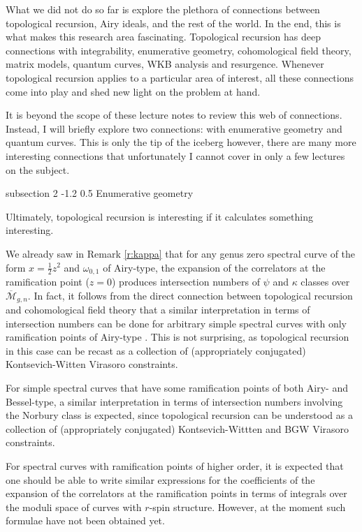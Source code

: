 \documentclass[reqno,oneside,11pt]{amsart}
\makeatletter
\theoremstyle{plain}
\theoremstyle{definition}
\theoremstyle{remark}
\numberwithin{equation}{section}
\renewcommand{\subsection}{\@startsection
{subsection}%
{2}%
{\z@}%
{-1.2\baselineskip}%
{0.5\baselineskip}%
{\normalfont \bf \normalsize}} %
\makeatother
\begin{document}
What we did not do so far is explore the plethora of connections between topological recursion, Airy ideals, and the rest of the world. In the end, this is what makes this research area fascinating. Topological recursion has deep connections with integrability, enumerative geometry, cohomological field theory, matrix models, quantum curves, WKB analysis and resurgence. Whenever topological recursion applies to a particular area of interest, all these connections come into play and shed new light on the problem at hand.

It is beyond the scope of these lecture notes to review this web of connections. Instead, I will briefly explore two connections: with enumerative geometry and quantum curves. This is only the tip of the iceberg however, there are many more interesting connections that unfortunately I cannot cover in only a few lectures on the subject.


\subsection{Enumerative geometry}

Ultimately, topological recursion is interesting if it calculates something interesting. 

We already saw in Remark \ref{r:kappa} that for any genus zero spectral curve of the form $x = \frac{1}{2}z^2$ and $\omega_{0,1}$ of Airy-type, the expansion of the correlators at the ramification point ($z=0$) produces intersection numbers of $\psi$ and $\kappa$ classes over $\overline{\mathcal{M}}_{g,n}$. In fact, it follows from the direct connection between topological recursion and cohomological field theory that a similar interpretation in terms of intersection numbers can be done for arbitrary simple spectral curves with only ramification points of Airy-type \cite{Ey11,DOSS12}. This is not surprising, as topological recursion in this case can be recast as a collection of (appropriately conjugated) Kontsevich-Witten Virasoro constraints.

For simple spectral curves that have some ramification points of both Airy- and Bessel-type, a similar interpretation in terms of intersection numbers involving the Norbury class is expected, since topological recursion can be understood as a collection of (appropriately conjugated) Kontsevich-Wittten and BGW  Virasoro constraints.

For spectral curves with ramification points of higher order, it is expected that one should be able to write similar expressions for the coefficients of the expansion of the correlators at the ramification points in terms of integrals over the moduli space of curves with $r$-spin structure. However, at the moment such formulae have not been obtained yet.
\end{document}
